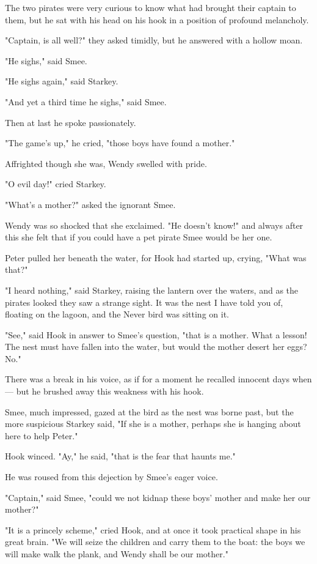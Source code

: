 The two pirates were very curious to know what had brought their captain to them,
but he sat with his head on his hook in a position of profound melancholy.

"Captain, is all well?\@" they asked timidly, but he answered with a hollow moan.

"He sighs," said Smee.

"He sighs again," said Starkey.

"And yet a third time he sighs," said Smee.

Then at last he spoke passionately.

"The game's up," he cried, "those boys have found a mother."

Affrighted though she was, Wendy swelled with pride.

"O evil day!\@" cried Starkey.

"What's a mother?\@" asked the ignorant Smee.

Wendy was so shocked that she exclaimed.
"He doesn't know!\@" and always after this she felt that if you could have a pet pirate Smee would be her one.

Peter pulled her beneath the water, for Hook had started up, crying, "What was that?"

"I heard nothing," said Starkey, raising the lantern over the waters,
and as the pirates looked they saw a strange sight.
It was the nest I have told you of, floating on the lagoon, and the Never bird was sitting on it.

"See," said Hook in answer to Smee's question, "that is a mother.
What a lesson!
The nest must have fallen into the water, but would the mother desert her eggs?
No."

There was a break in his voice, as if for a moment he recalled innocent days when—%
but he brushed away this weakness with his hook.

Smee, much impressed, gazed at the bird as the nest was borne past,
but the more suspicious Starkey said, "If she is a mother, perhaps she is hanging about here to help Peter."

Hook winced.
"Ay," he said, "that is the fear that haunts me."

He was roused from this dejection by Smee's eager voice.

"Captain," said Smee, "could we not kidnap these boys' mother and make her our mother?"

"It is a princely scheme," cried Hook, and at once it took practical shape in his great brain.
"We will seize the children and carry them to the boat:
the boys we will make walk the plank, and Wendy shall be our mother."

